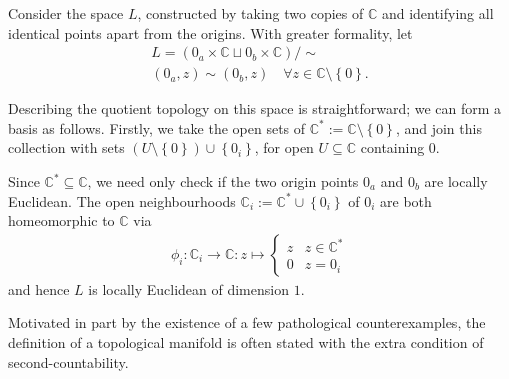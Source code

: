 \begin{example}\label{ex:complex-plane-2-origins}
	Consider the space $ L $, constructed by taking two copies of $ \mathbb{C} $ and
	identifying all identical points apart from the origins. With greater formality,
	let
	\begin{gather*}
		L = \left( 0_a \times \mathbb{C} \sqcup 0_b \times \mathbb{C} \right)/{\sim}\\
		(0_a,z) \sim (0_b , z) \quad \forall z \in \mathbb{C}\setminus \left\{ 0 \right\}.
	\end{gather*}
	\begin{center}
	\end{center}
	Describing the quotient topology on this space is straightforward; we can form a
	basis as follows. Firstly, we take the open sets of $ \mathbb{C}^{*} :=
		\mathbb{C}\setminus \left\{ 0 \right\} $, and join this collection with sets $
		(U \setminus \left\{ 0\right\}) \cup \left\{ 0_i \right\} $, for open $ U \subseteq
		\mathbb{C} $ containing $ 0 $.

	Since $ \mathbb{C}^{*} \subseteq \mathbb{C} $, we need only check if the two
	origin points $ 0_a $ and $ 0_b $ are locally Euclidean. The open neighbourhoods $
		\mathbb{C}_{i}:=\mathbb{C}^{*}\cup \left\{ 0_i \right\} $ of $ 0_i $ are both
	homeomorphic to $ \mathbb{C}$ via
	\begin{align*}
		\phi_i: \mathbb{C}_{i} \to \mathbb{C}: z \mapsto \begin{cases}
			                                                 z & z \in \mathbb{C}^{*} \\
			                                                 0 & z = 0_i
		                                                 \end{cases}
	\end{align*}
	and hence $ L $ is locally Euclidean of dimension $ 1 $.
\end{example}

Motivated in part by the existence of a few pathological counterexamples, the
definition of a topological manifold is often stated with the extra condition of
second-countability.


